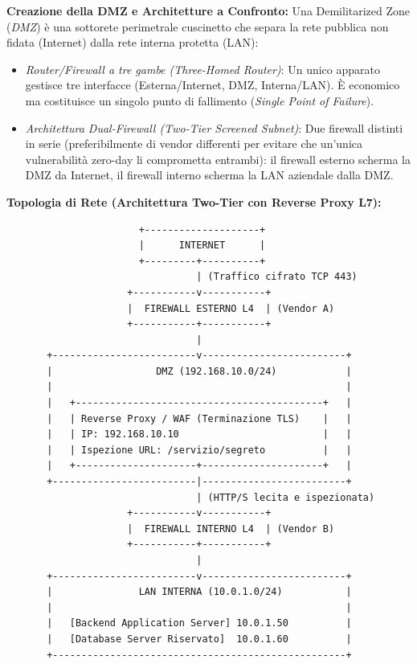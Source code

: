 \documentclass[11pt,a4paper]{article}
\begin{document}
\begin{solutionbox}
\textbf{Creazione della DMZ e Architetture a Confronto:}
Una Demilitarized Zone (\textit{DMZ}) \`e una sottorete perimetrale cuscinetto che separa la rete pubblica non fidata (Internet) dalla rete interna protetta (LAN):
\begin{itemize}
    \item \textit{Router/Firewall a tre gambe (Three-Homed Router)}: Un unico apparato gestisce tre interfacce (Esterna/Internet, DMZ, Interna/LAN). \`E economico ma costituisce un singolo punto di fallimento (\textit{Single Point of Failure}).
    \item \textit{Architettura Dual-Firewall (Two-Tier Screened Subnet)}: Due firewall distinti in serie (preferibilmente di vendor differenti per evitare che un'unica vulnerabilit\`a zero-day li comprometta entrambi): il firewall esterno scherma la DMZ da Internet, il firewall interno scherma la LAN aziendale dalla DMZ.
\end{itemize}

\textbf{Topologia di Rete (Architettura Two-Tier con Reverse Proxy L7):}
\begin{center}
\begin{verbatim}
                       +--------------------+
                       |      INTERNET      |
                       +---------+----------+
                                 | (Traffico cifrato TCP 443)
                     +-----------v-----------+
                     |  FIREWALL ESTERNO L4  | (Vendor A)
                     +-----------+-----------+
                                 |
       +-------------------------v-------------------------+
       |                  DMZ (192.168.10.0/24)            |
       |                                                   |
       |   +-------------------------------------------+   |
       |   | Reverse Proxy / WAF (Terminazione TLS)    |   |
       |   | IP: 192.168.10.10                         |   |
       |   | Ispezione URL: /servizio/segreto          |   |
       |   +---------------------+---------------------+   |
       +-------------------------|-------------------------+
                                 | (HTTP/S lecita e ispezionata)
                     +-----------v-----------+
                     |  FIREWALL INTERNO L4  | (Vendor B)
                     +-----------+-----------+
                                 |
       +-------------------------v-------------------------+
       |               LAN INTERNA (10.0.1.0/24)           |
       |                                                   |
       |   [Backend Application Server] 10.0.1.50          |
       |   [Database Server Riservato]  10.0.1.60          |
       +---------------------------------------------------+
\end{verbatim}
\end{center}


\end{solutionbox}
\end{document}
